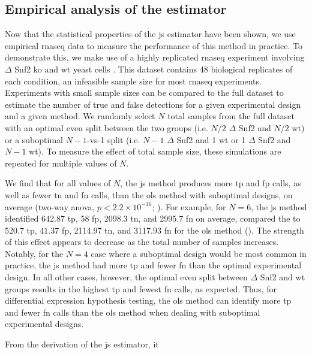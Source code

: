 \subsection{Empirical analysis of the  estimator}

Now that the statistical properties of the \gls{js} estimator have been shown, we use empirical \gls{rnaseq} data to measure the performance of this method in practice.
To demonstrate this, we make use of a highly replicated \gls{rnaseq} experiment involving $\Delta$ Snf2 \gls{ko} and \gls{wt} yeast cells \cite{gierlinskiStatisticalModelsRNAseq2015}.
This dataset contains 48 biological replicates of each condition, an infeasible sample size for most \gls{rnaseq} experiments.
Experiments with small sample sizes can be compared to the full dataset to estimate the number of true and false detections for a given experimental design and a given method.
We randomly select $N$ total samples from the full dataset with an optimal even split between the two groups (i.e. $N / 2$ $\Delta$ Snf2 and $N / 2$ \gls{wt}) or a suboptimal $N - 1$-vs-1 split (i.e. $N - 1$ $\Delta$ Snf2 and 1 \gls{wt} or 1 $\Delta$ Snf2 and $N - 1$ \gls{wt}).
To measure the effect of total sample size, these simulations are repeated for multiple values of $N$.

We find that for all values of $N$, the \gls{js} method produces more \gls{tp} and \gls{fp} calls, as well as fewer \gls{tn} and \gls{fn} calls, than the \gls{ols} method with suboptimal designs, on average (two-way \gls{anova}, $p < 2.2 \times 10^{-16}$; ).
For example, for $N = 6$, the \gls{js} method identified 642.87 \gls{tp}, 58 \gls{fp}, 2098.3 \gls{tn}, and 2995.7 \gls{fn} on average, compared the to 520.7 \gls{tp}, 41.37 \gls{fp}, 2114.97 \gls{tn}, and 3117.93 \gls{fn} for the \gls{ols} method ().
The strength of this effect appears to decrease as the total number of samples increases.
Notably, for the $N = 4$ case where a suboptimal design would be most common in practice, the \gls{js} method had more \gls{tp} and fewer \gls{fn} than the optimal experimental design.
In all other cases, however, the optimal even split between $\Delta $ Snf2 and \gls{wt} groups results in the highest \gls{tp} and fewest \gls{fn} calls, as expected.
Thus, for differential expression hypothesis testing, the \gls{ols} method can identify more \gls{tp} and fewer \gls{fn} calls than the \gls{ols} method when dealing with suboptimal experimental designs.

From the derivation of the \gls{js} estimator, it 

